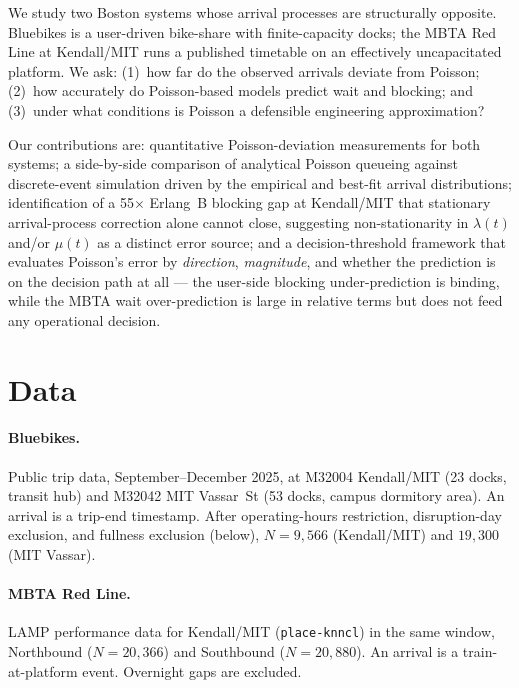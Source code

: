 We study two Boston systems whose arrival processes are structurally opposite. Bluebikes is a user-driven bike-share with finite-capacity docks; the MBTA Red Line at Kendall/MIT runs a published timetable on an effectively uncapacitated platform. We ask: (1)~how far do the observed arrivals deviate from Poisson; (2)~how accurately do Poisson-based models predict wait and blocking; and (3)~under what conditions is Poisson a defensible engineering approximation?

Our contributions are: quantitative Poisson-deviation measurements for both systems; a side-by-side comparison of analytical Poisson queueing against discrete-event simulation driven by the empirical and best-fit arrival distributions; identification of a 55$\times$ Erlang~B blocking gap at Kendall/MIT that stationary arrival-process correction alone cannot close, suggesting non-stationarity in $\lambda(t)$ and/or $\mu(t)$ as a distinct error source; and a decision-threshold framework that evaluates Poisson's error by \emph{direction}, \emph{magnitude}, and whether the prediction is on the decision path at all --- the user-side blocking under-prediction is binding, while the MBTA wait over-prediction is large in relative terms but does not feed any operational decision.

\section{Data}\label{sec:data}

\paragraph{Bluebikes.} Public trip data, September--December 2025, at M32004 Kendall/MIT (23 docks, transit hub) and M32042 MIT Vassar~St (53 docks, campus dormitory area). An arrival is a trip-end timestamp. After operating-hours restriction, disruption-day exclusion, and fullness exclusion (below), $N = 9{,}566$ (Kendall/MIT) and $19{,}300$ (MIT Vassar).

\paragraph{MBTA Red Line.} LAMP performance data \cite{mbta_lamp} for Kendall/MIT (\texttt{place-knncl}) in the same window, Northbound ($N = 20{,}366$) and Southbound ($N = 20{,}880$). An arrival is a train-at-platform event. Overnight gaps are excluded.

